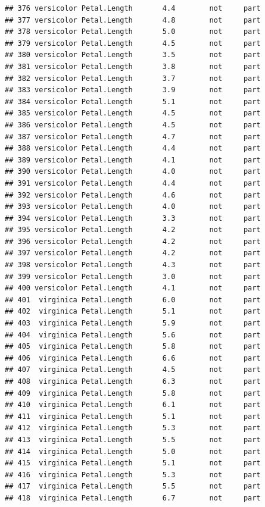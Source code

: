\documentclass[krantz2]{krantz}\usepackage{knitr}%
\begin{document}
\begin{knitrout}
\begin{kframe}
\begin{verbatim}
## 376 versicolor Petal.Length       4.4        not     part
## 377 versicolor Petal.Length       4.8        not     part
## 378 versicolor Petal.Length       5.0        not     part
## 379 versicolor Petal.Length       4.5        not     part
## 380 versicolor Petal.Length       3.5        not     part
## 381 versicolor Petal.Length       3.8        not     part
## 382 versicolor Petal.Length       3.7        not     part
## 383 versicolor Petal.Length       3.9        not     part
## 384 versicolor Petal.Length       5.1        not     part
## 385 versicolor Petal.Length       4.5        not     part
## 386 versicolor Petal.Length       4.5        not     part
## 387 versicolor Petal.Length       4.7        not     part
## 388 versicolor Petal.Length       4.4        not     part
## 389 versicolor Petal.Length       4.1        not     part
## 390 versicolor Petal.Length       4.0        not     part
## 391 versicolor Petal.Length       4.4        not     part
## 392 versicolor Petal.Length       4.6        not     part
## 393 versicolor Petal.Length       4.0        not     part
## 394 versicolor Petal.Length       3.3        not     part
## 395 versicolor Petal.Length       4.2        not     part
## 396 versicolor Petal.Length       4.2        not     part
## 397 versicolor Petal.Length       4.2        not     part
## 398 versicolor Petal.Length       4.3        not     part
## 399 versicolor Petal.Length       3.0        not     part
## 400 versicolor Petal.Length       4.1        not     part
## 401  virginica Petal.Length       6.0        not     part
## 402  virginica Petal.Length       5.1        not     part
## 403  virginica Petal.Length       5.9        not     part
## 404  virginica Petal.Length       5.6        not     part
## 405  virginica Petal.Length       5.8        not     part
## 406  virginica Petal.Length       6.6        not     part
## 407  virginica Petal.Length       4.5        not     part
## 408  virginica Petal.Length       6.3        not     part
## 409  virginica Petal.Length       5.8        not     part
## 410  virginica Petal.Length       6.1        not     part
## 411  virginica Petal.Length       5.1        not     part
## 412  virginica Petal.Length       5.3        not     part
## 413  virginica Petal.Length       5.5        not     part
## 414  virginica Petal.Length       5.0        not     part
## 415  virginica Petal.Length       5.1        not     part
## 416  virginica Petal.Length       5.3        not     part
## 417  virginica Petal.Length       5.5        not     part
## 418  virginica Petal.Length       6.7        not     part

\end{verbatim}
\end{kframe}
\end{knitrout}
\end{document}
